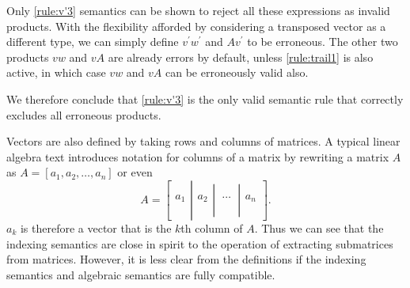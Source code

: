 Only \ref{rule:v'3} semantics can be shown to reject all these expressions as
invalid products. With the flexibility afforded by considering a transposed
vector as a different type, we can simply define $v^\prime w^\prime$ and
$Av^\prime$ to be erroneous. The other two products $vw$ and $vA$ are already
errors by default, unless \ref{rule:trail1} is also active, in which case $vw$
and $vA$ can be erroneously valid also.

We therefore conclude that \ref{rule:v'3} is the only valid semantic rule that
correctly excludes all erroneous products.



Vectors are also defined
by taking rows and columns of matrices. A typical linear algebra text
introduces notation for columns of a matrix by rewriting a matrix $A$ as
$A = [a_1, a_2, \dots, a_n]$ or even ~\cite[for example,
p. 6]{Trefethen1997}
\[
A = \left[\left.\begin{array}{c}
\\
\\
a_1\\
\\
\\
\end{array}\right|\begin{array}{c}
\\
\\
a_2\\
\\
\\
\end{array}\left|\begin{array}{c}
\\
\\
\ \cdots\ \\
\\
\\
\end{array}\right|\begin{array}{c}
\\
\\
a_n\\
\\
\\
\end{array}\right]
	.\label{eq:cols}
\]
%
$a_k$ is therefore a vector that is the $k$th column of $A$.  Thus we can see that
the indexing semantics are close in spirit to the operation of extracting
submatrices from matrices. However, it is less clear from the definitions if
the indexing semantics and algebraic semantics are fully compatible.



